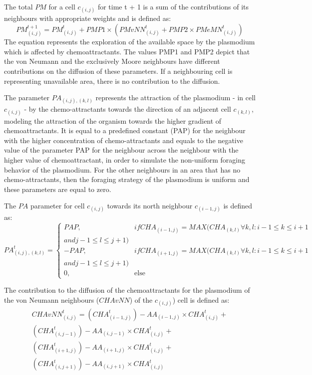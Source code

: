The total $PM$ for a cell $c_{(i,j)}$ for time t + 1 is a sum of the contributions of its neighbours with appropriate weights and is defined as:
\begin{equation}
PM^{t+1}_{(i, j)} = PM^t_{(i, j)} + PMP1 \times (PMvNN^t_{(i, j)} + PMP2 \times PMeMN^t_{(i, j)})
\end{equation}
The equation represents the exploration of the available space by the plasmodium which is affected by chemoattractants. The values PMP1 and PMP2 depict that the von Neumann and the exclusively Moore neighbours have different contributions on the diffusion of these parameters. If a neighbouring cell is representing unavailable area, there is no contribution to the diffusion.
 
\par
The parameter $PA_{(i, j),(k,l)}$ represents the attraction of the plasmodium - in cell $c_{(i,j)}$ - by the chemo-attractants towards the direction of an adjacent cell $c_{(k,l)}$, modeling the attraction of the organism towards the higher gradient of chemoattractants. It is equal to a predefined constant (PAP) for the neighbour with the higher concentration of chemo-attractants and equals to the negative value of the parameter PAP for the neighbour across the neighbour with the higher value of chemoattractant, in order to simulate the non-uniform foraging behavior of the plasmodium. For the other neighbours in an area that has no chemo-attractants, then the foraging strategy of the plasmodium is uniform and these parameters are equal to zero.

\par
The $PA$ parameter for cell $c_{(i,j)}$ towards its north neighbour $c_{(i-1,j)}$ is defined as:
\begin{equation}
PA^t_{(i, j),(k,l)}=
\begin{cases} 
PAP, & if CHA_{(i-1, j)} = MAX(CHA_{(k, l)} \forall k, l: i - 1 \leq k \leq i + 1 \\and j - 1 \leq l \leq j+1) \\ 
- PAP, & if CHA_{(i+1, j)} = MAX(CHA_{(k, l)} \forall k, l: i - 1 \leq k \leq i + 1 \\and j - 1 \leq l \leq j+1) \\ 
0, & \mbox{else}
\end{cases}
\end{equation}

\par
The contribution to the diffusion of the chemoattractants for the plasmodium of the von Neumann neighbours ($CHAvNN$) of the $c_{(i,j)}$) cell is defined as:
\begin{equation}
\begin{split}
CHAvNN^t_{(i, j)} = 
(CHA^t_{(i-1, j)}) - AA_{(i-1, j)} \times CHA^t_{(i, j)} +
\\(CHA^t_{(i, j-1)}) - AA_{(i, j-1)} \times CHA^t_{(i, j)} +
\\(CHA^t_{(i+1, j)}) - AA_{(i+1, j)} \times CHA^t_{(i, j)}  +
\\(CHA^t_{(i, j+1)}) - AA_{(i, j+1)} \times CHA^t_{(i, j)}
\end{split}
\end{equation}

